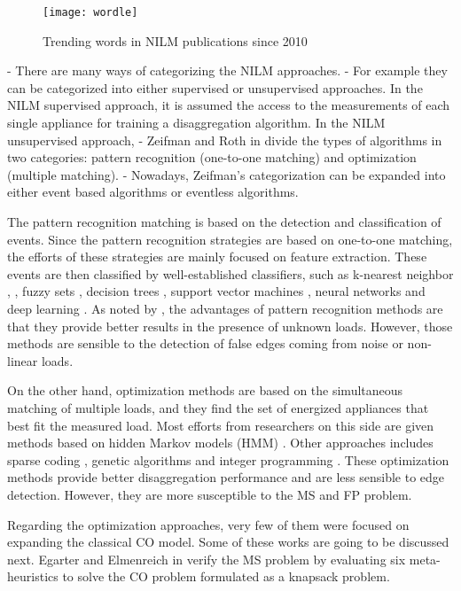 \begin{figure}[bt]
    \centering
    \texttt{[image: wordle]}
    \caption{Trending words in NILM publications since 2010}
    \label{wordle}
\end{figure}

- There are many ways of categorizing the NILM approaches. 
- For example they can be categorized into either supervised or unsupervised approaches. In the NILM supervised approach, it is assumed the access to the measurements of each single appliance for training a disaggregation algorithm. In the NILM unsupervised approach, 
- Zeifman and Roth in \cite{zeifman} divide the types of algorithms in two categories: pattern recognition (one-to-one matching) and optimization (multiple matching).
- Nowadays, Zeifman's categorization can be expanded into either event based algorithms or eventless algorithms. 

The pattern recognition matching is based on the detection and classification of events. Since the pattern recognition strategies are based on one-to-one matching, the efforts of these strategies are mainly focused on feature extraction. These events are then classified by well-established classifiers, such as k-nearest neighbor \cite{Figueiredo2011}, \cite{berges2009, Froehlich2010}, fuzzy sets \cite{lin2011, ducange2014}, decision trees \cite{Nguyen2015, gillis2016}, support vector machines \cite{duarte2012, zoha2012}, neural networks \cite{zhou2016, bian2016} and deep learning \cite{mauch2016, jack2015}. As noted by \cite{zeifman}, the advantages of pattern recognition methods are that they provide better results in the presence of unknown loads. However, those methods are sensible to the detection of false edges coming from noise or non-linear loads.

On the other hand, optimization methods are based on the simultaneous matching of multiple loads, and they find the set of energized appliances that best fit the measured load. Most efforts from researchers on this side are given methods based on hidden Markov models (HMM) \cite{afhmm, reed, hmm_unsup, stephen_hmm}. Other approaches includes sparse coding \cite{sparse_kolter, nmf}, genetic algorithms \cite{meta} and integer programming \cite{suzuki, bhotto2016}. These optimization methods provide better disaggregation performance \cite{zeifman} and are less sensible to edge detection. However, they are more susceptible to the MS and FP problem.

Regarding the optimization approaches, very few of them were focused on expanding the classical CO model. Some of these works are going to be discussed next. Egarter and Elmenreich in \cite{meta} verify the MS problem by evaluating six meta-heuristics to solve the CO problem formulated as a knapsack problem. 

